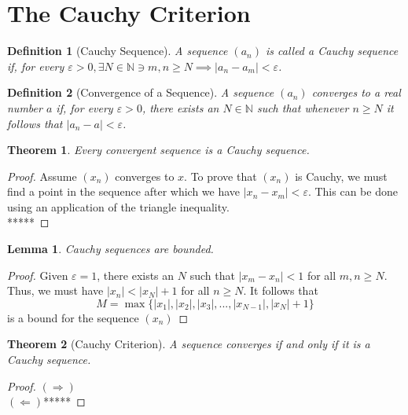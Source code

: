 \documentclass[10pt]{report}
\newtheorem{thm2}{Theorem}[section]
\newtheorem{lem2}{Lemma}[section]
\newtheorem{def2}{Definition}[section]
\newcommand{\eps}{\varepsilon}
\begin{document}
\section{The Cauchy Criterion}
\begin{def2}[Cauchy Sequence]
A sequence $(a_n)$ is called a Cauchy sequence if, for every $\eps>0, \exists N\in\mathbb{N}\ni m,n\geq N\implies |a_n - a_m|<\eps$.
\end{def2}
\begin{def2}[Convergence of a Sequence]
A sequence $(a_n)$ converges to a real number $a$ if, for every $\eps>0$, there exists an $N\in\mathbb{N}$ such that whenever $n\geq N$ it follows that $|a_n-a|<\eps$.
\end{def2}
\begin{thm2}
Every convergent sequence is a Cauchy sequence.
\end{thm2}
\begin{proof}
Assume $(x_n)$ converges to $x$. To prove that $(x_n)$ is Cauchy, we must find a point in the sequence after which we have $|x_n-x_m|<\eps$. This can be done using an application of the triangle inequality.\\
*****
\end{proof}
\begin{lem2}
Cauchy sequences are bounded.
\end{lem2}
\begin{proof}
Given $\eps=1$, there exists an $N$ such that $|x_m-x_n|<1$ for all $m,n\geq N$. Thus, we must have $|x_n|<|x_N|+1$ for all $n\geq N$. It follows that
$$M=\max\{|x_1|,|x_2|,|x_3|,...,|x_{N-1}|,|x_N|+1\}$$
is a bound for the sequence $(x_n)$
\end{proof}
\begin{thm2}[Cauchy Criterion]
A sequence converges if and only if it is a Cauchy sequence.
\end{thm2}
\begin{proof}
$(\Rightarrow)$\\
$(\Leftarrow)$*****
\end{proof}
\end{document}
